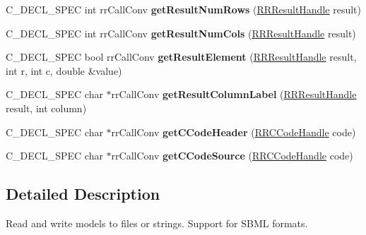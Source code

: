 \begin{DoxyCompactItemize}
\item 
\hypertarget{group__loadsave_ga45793ae8175e37d42bb0fed8629cedb3}{
\-C\-\_\-\-D\-E\-C\-L\-\_\-\-S\-P\-E\-C int rr\-Call\-Conv {\bfseries get\-Result\-Num\-Rows} (\hyperlink{struct_r_r_result}{\-R\-R\-Result\-Handle} result)}
\label{group__loadsave_ga45793ae8175e37d42bb0fed8629cedb3}

\item 
\hypertarget{group__loadsave_gac8e0a87e6231d8f5828b679116b2d6a7}{
\-C\-\_\-\-D\-E\-C\-L\-\_\-\-S\-P\-E\-C int rr\-Call\-Conv {\bfseries get\-Result\-Num\-Cols} (\hyperlink{struct_r_r_result}{\-R\-R\-Result\-Handle} result)}
\label{group__loadsave_gac8e0a87e6231d8f5828b679116b2d6a7}

\item 
\hypertarget{group__loadsave_gab8f77529dcd45bef9ebe627b88831d52}{
\-C\-\_\-\-D\-E\-C\-L\-\_\-\-S\-P\-E\-C bool rr\-Call\-Conv {\bfseries get\-Result\-Element} (\hyperlink{struct_r_r_result}{\-R\-R\-Result\-Handle} result, int r, int c, double \&value)}
\label{group__loadsave_gab8f77529dcd45bef9ebe627b88831d52}

\item 
\hypertarget{group__loadsave_ga9ddbfbe25f45e7232d0526bf51147fd3}{
\-C\-\_\-\-D\-E\-C\-L\-\_\-\-S\-P\-E\-C char $\ast$rr\-Call\-Conv {\bfseries get\-Result\-Column\-Label} (\hyperlink{struct_r_r_result}{\-R\-R\-Result\-Handle} result, int column)}
\label{group__loadsave_ga9ddbfbe25f45e7232d0526bf51147fd3}

\item 
\hypertarget{group__loadsave_ga071cb3c138a8aaf96992daec8fd6a7c2}{
\-C\-\_\-\-D\-E\-C\-L\-\_\-\-S\-P\-E\-C char $\ast$rr\-Call\-Conv {\bfseries get\-C\-Code\-Header} (\hyperlink{struct_r_r_c_code}{\-R\-R\-C\-Code\-Handle} code)}
\label{group__loadsave_ga071cb3c138a8aaf96992daec8fd6a7c2}

\item 
\hypertarget{group__loadsave_gabb964f1aad030deee67c313d9bdf3520}{
\-C\-\_\-\-D\-E\-C\-L\-\_\-\-S\-P\-E\-C char $\ast$rr\-Call\-Conv {\bfseries get\-C\-Code\-Source} (\hyperlink{struct_r_r_c_code}{\-R\-R\-C\-Code\-Handle} code)}
\label{group__loadsave_gabb964f1aad030deee67c313d9bdf3520}

\end{DoxyCompactItemize}


\subsection{\-Detailed \-Description}
\-Read and write models to files or strings. \-Support for \-S\-B\-M\-L formats. 


